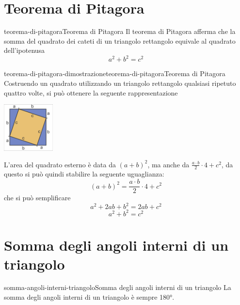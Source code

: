 \documentclass[preview]{standalone}
\begin{document}
\genpage

\section{Teorema di Pitagora}

\begin{snippettheorem}{teorema-di-pitagora}{Teorema di Pitagora}
  Il teorema di Pitagora afferma che la somma del quadrato dei cateti di un triangolo rettangolo
  equivale al quadrato dell'ipotenusa
  \[
    a^2 + b^2 = c^2
  \]
\end{snippettheorem}

\begin{snippetproof}{teorema-di-pitagora-dimostrazione}{teorema-di-pitagora}{Teorema di Pitagora}
    Costruendo un quadrato utilizzando un triangolo rettangolo qualsiasi ripetuto quattro volte,
    si può ottenere la seguente rappresentazione

    \vspace{0.5cm}

    \begin{center}
        \includegraphics[width=0.2\textwidth]{resources/pythagorean-theorem-proof.png}
    \end{center}

    \vspace{0.5cm}

    L'area del quadrato esterno è data da \( (a + b)^2 \), ma anche da \( \frac{a \cdot b}{2} \cdot 4 + c^2\), da questo
    si può quindi stabilire la seguente uguaglianza:
    \[ 
       (a + b)^2 = \frac{a \cdot b}{2} \cdot 4 + c^2
    \]
    che si può semplificare
    \[ 
      a^2 + 2ab + b^2 = 2ab + c^2 
    \]
    \[ 
      a^2 + b^2 = c^2
    \]
\end{snippetproof}

\section{Somma degli angoli interni di un triangolo}

\begin{snippettheorem}{somma-angoli-interni-triangolo}{Somma degli angoli interni di un triangolo}
  La somma degli angoli interni di un triangolo è sempre 180°.
\end{snippettheorem}
\end{document}

